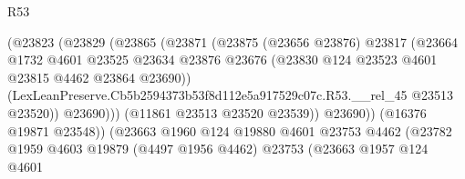 \begin{lexlean}{R53}
\begin{coremodule}
                                          (@23823
                                            (@23829
                                              (@23865
                                                (@23871
                                                  (@23875
                                                    (@23656 @23876)
                                                    @23817
                                                    (@23664
                                                      @1732
                                                      @4601
                                                      @23525
                                                      @23634
                                                      @23876
                                                      @23676
                                                      (@23830
                                                        @124
                                                        @23523
                                                        @4601
                                                        @23815
                                                        @4462
                                                        @23864
                                                        @23690))
                                                    (LexLeanPreserve.Cb5b2594373b53f8d112e5a917529c07c.R53.__rel_45
                                                      @23513
                                                      @23520))
                                                  @23690)))
                                            (@11861 @23513 @23520 @23539))
                                          @23690))
                                      (@16376 @19871 @23548))
                                    (@23663
                                      @1960
                                      @124
                                      @19880
                                      @4601
                                      @23753
                                      @4462
                                      (@23782
                                        @1959
                                        @4603
                                        @19879
                                        (@4497 @1956 @4462)
                                        @23753
                                        (@23663
                                          @1957
                                          @124
                                          @4601

\end{coremodule}
\end{lexlean}
